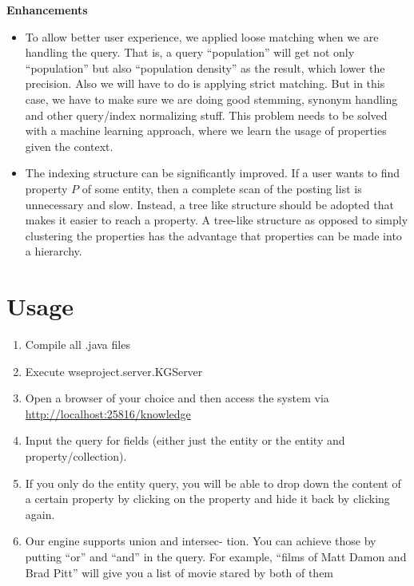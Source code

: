 \documentclass[11pt,twocolumn]{article}
\begin{document}
{\bf Enhancements}

\begin{itemize}
\item 
To allow better user experience, we applied loose matching when we are handling the query. That is, a query ``population'' will get not only ``population'' but also ``population density'' as the result, which lower the precision. Also we will have to do is applying strict matching. But in this case, we have to make sure we are doing good stemming, synonym handling and other query/index normalizing stuff. This problem needs to be solved with a machine learning approach, where we learn the usage of properties given the context.

\item 
The indexing structure can be significantly improved. If a user wants to find property $P$ of some entity, then a complete scan of the posting list is unnecessary and slow. Instead, a tree like structure should be adopted that makes it easier to reach a property. A tree-like structure as opposed to simply clustering the properties has the advantage that properties can be made into a hierarchy.


\end{itemize}




\section{Usage}
\begin{enumerate}
\item 
Compile all .java files 
\item 
Execute wseproject.server.KGServer
\item 
Open a browser of your choice and then access the system via \url{http://localhost:25816/knowledge}
\item
Input the query for fields (either just the entity or the entity and property/collection). 
\item If you only do the entity query, you will be able to drop down the content of a certain property by clicking on the property and hide it back by clicking again.
\item Our engine supports union and intersec- tion. You can achieve those by putting ``or'' and ``and'' in the query. For example, ``films of Matt Damon and Brad Pitt'' will give you a list of movie stared by both of them

\end{enumerate}
\end{document}
